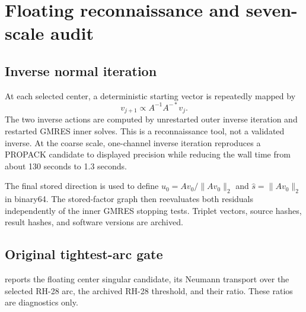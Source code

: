 \documentclass[11pt]{article}
\theoremstyle{definition}
\theoremstyle{remark}
\begin{document}
\section{Floating reconnaissance and seven-scale audit}
\label{sec:numerics}

\subsection{Inverse normal iteration}

At each selected center, a deterministic starting vector is repeatedly
mapped by
\begin{equation}
 v_{j+1}\propto A^{-1}A^{-*}v_j.
 \label{eq:inverse-iteration}
\end{equation}
The two inverse actions are computed by unrestarted outer inverse iteration
and restarted GMRES inner solves.  This is a reconnaissance tool, not a
validated inverse.  At the coarse scale, one-channel inverse iteration
reproduces a PROPACK candidate to displayed precision while reducing the
wall time from about 130 seconds to 1.3 seconds.

The final stored direction is used to define $u_0=Av_0/\|Av_0\|_2$ and
$\widehat s=\|Av_0\|_2$ in binary64.  The stored-factor graph then reevaluates
both residuals independently of the inner GMRES stopping tests.  Triplet
vectors, source hashes, result hashes, and software versions are archived.

\subsection{Original tightest-arc gate}

 reports the floating center singular candidate,
its Neumann transport over the selected RH-28 arc, the archived RH-28
threshold, and their ratio.  These ratios are diagnostics only.
\end{document}
